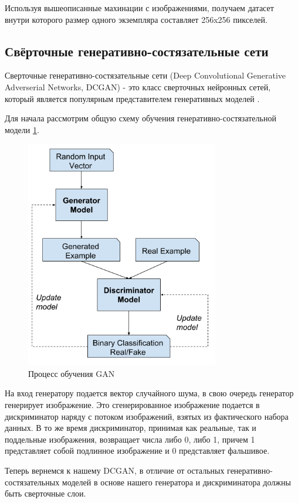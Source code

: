 Используя вышеописанные махинации с изображениями, получаем датасет внутри которого размер одного экземпляра составляет 256x256 пикселей.

\subsection{Свёрточные генеративно-состязательные сети}

\begin{definition}
    Сверточные генеративно-состязательные сети (Deep Convolutional Generative Adverserial Networks, DCGAN) - это класс сверточных нейронных сетей, который является популярным представителем генеративных моделей \cite{dcgan}.
\end{definition}

Для начала рассмотрим общую схему обучения генеративно-состязательной модели {\color{blue} \ref{fig.GAN_fit_scheme}}.
\begin{figure}
    \centering
    \includegraphics[height=100mm]{fig/GAN_fit_scheme.png}
    \caption{Процесс обучения GAN}
    \label{fig.GAN_fit_scheme}
\end{figure}
На вход генератору подается вектор случайного шума, в свою очередь генератор генерирует изображение. Это сгенерированное изображение подается в дискриминатор наряду с потоком изображений, взятых из фактического набора данных. В то же время дискриминатор, принимая как реальные, так и поддельные изображения, возвращает числа либо 0, либо 1, причем 1 представляет собой подлинное изображение и 0 представляет фальшивое.

Теперь вернемся к нашему DCGAN, в отличие от остальных генеративно-состязательных моделей в основе нашего генератора и дискриминатора должны быть сверточные слои.

